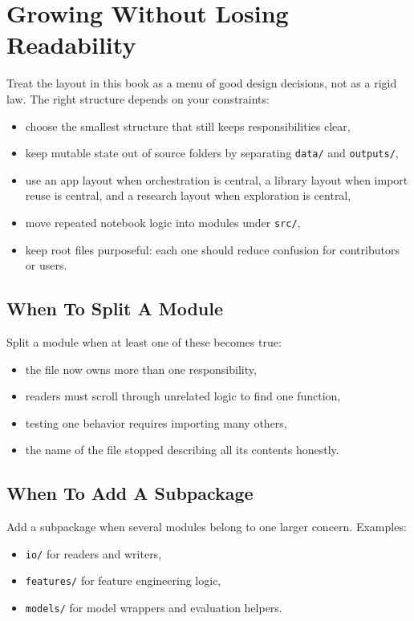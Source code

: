 \documentclass[11pt,oneside]{book}
\begin{document}
\chapter{Growing Without Losing Readability}

Treat the layout in this book as a menu of good design decisions, not as a rigid law.  
The right structure depends on your constraints:
\begin{itemize}
  \item choose the smallest structure that still keeps responsibilities clear,
  \item keep mutable state out of source folders by separating \texttt{data/} and \texttt{outputs/},
  \item use an app layout when orchestration is central, a library layout when import reuse is central, and a research layout when exploration is central,
  \item move repeated notebook logic into modules under \texttt{src/},
  \item keep root files purposeful: each one should reduce confusion for contributors or users.
\end{itemize}

\section*{When To Split A Module}

Split a module when at least one of these becomes true:
\begin{itemize}
  \item the file now owns more than one responsibility,
  \item readers must scroll through unrelated logic to find one function,
  \item testing one behavior requires importing many others,
  \item the name of the file stopped describing all its contents honestly.
\end{itemize}

\section*{When To Add A Subpackage}

Add a subpackage when several modules belong to one larger concern.  
Examples:
\begin{itemize}
  \item \texttt{io/} for readers and writers,
  \item \texttt{features/} for feature engineering logic,
  \item \texttt{models/} for model wrappers and evaluation helpers.
\end{itemize}
\end{document}
